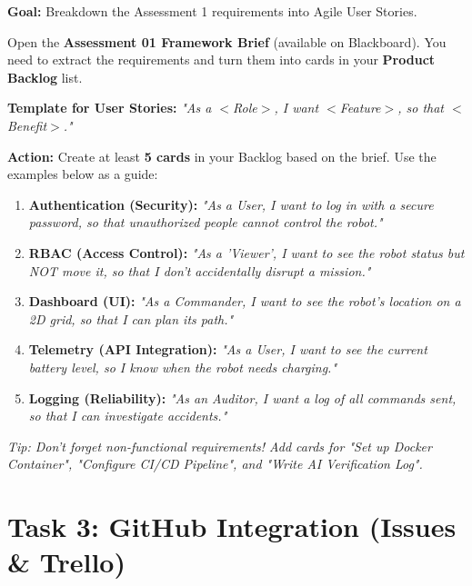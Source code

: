 \documentclass[a4paper,12pt]{article}
\begin{document}
\textbf{Goal:} Breakdown the Assessment 1 requirements into Agile User Stories.

\noindent Open the \textbf{Assessment 01 Framework Brief} (available on Blackboard). You need to extract the requirements and turn them into cards in your \textbf{Product Backlog} list.

\vspace{0.3cm}
\noindent \textbf{Template for User Stories:}
\textit{"As a $<$Role$>$, I want $<$Feature$>$, so that $<$Benefit$>$."}

\vspace{0.3cm}
\noindent \textbf{Action:} Create at least \textbf{5 cards} in your Backlog based on the brief. Use the examples below as a guide:

\begin{enumerate}
    \item \textbf{Authentication (Security):}
    \textit{"As a User, I want to log in with a secure password, so that unauthorized people cannot control the robot."}
    \item \textbf{RBAC (Access Control):}
    \textit{"As a 'Viewer', I want to see the robot status but NOT move it, so that I don't accidentally disrupt a mission."}
    \item \textbf{Dashboard (UI):}
    \textit{"As a Commander, I want to see the robot's location on a 2D grid, so that I can plan its path."}
    \item \textbf{Telemetry (API Integration):}
    \textit{"As a User, I want to see the current battery level, so I know when the robot needs charging."}
    \item \textbf{Logging (Reliability):}
    \textit{"As an Auditor, I want a log of all commands sent, so that I can investigate accidents."}
\end{enumerate}

\noindent \textit{Tip: Don't forget non-functional requirements! Add cards for "Set up Docker Container", "Configure CI/CD Pipeline", and "Write AI Verification Log".}


\section*{Task 3: GitHub Integration (Issues \& Trello)}
\end{document}
